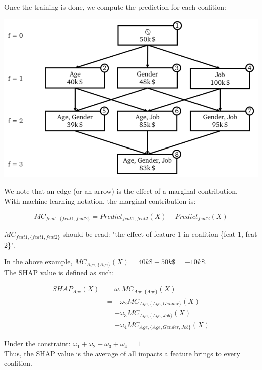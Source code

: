 Once the training is done, we compute the prediction for each coalition:

\begin{center}
\includegraphics[scale=0.35]{powerset_2.png}
\end{center}

We note that an edge (or an arrow) is the effect of a marginal contribution. \\

With machine learning notation, the marginal contribution is:

$$MC_{feat 1, \{feat 1, feat 2\}} = Predict_{feat 1, feat 2}(X) - Predict_{feat 2}(X)$$

$MC_{feat 1, \{feat 1, feat 2\}}$ should be read: "the effect of feature 1 in coalition \{feat 1, feat 2\}".

In the above example, $MC_{Age, \{Age\}} (X) = 40k\$ - 50k\$ = -10k\$$. \\

The SHAP value is defined as such:

\begin{align*}
  SHAP_{Age}(X) &= \omega_1 MC_{Age, \{Age\}}(X)  \\
            &= + \omega_2 MC_{Age, \{Age, Gender\}}(X)  \\
	   &= + \omega_3 MC_{Age, \{Age, Job\}}(X) \\
	   &= + \omega_4 MC_{Age, \{Age, Gender, Job\}}(X)
\end{align*}

Under the constraint: $\omega_1 + \omega_2 + \omega_3 + \omega_4 = 1$ \\

Thus, the SHAP value is the average of all impacts a feature brings to every coalition. \\

